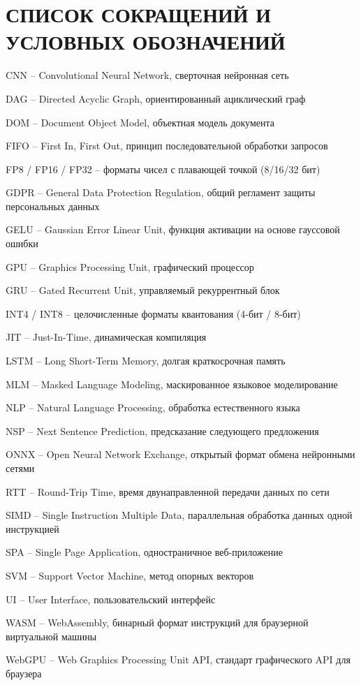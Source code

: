 \chapter*{СПИСОК СОКРАЩЕНИЙ И УСЛОВНЫХ ОБОЗНАЧЕНИЙ}

\noindent CNN – Convolutional Neural Network, сверточная нейронная сеть

\noindent DAG – Directed Acyclic Graph, ориентированный ациклический граф

\noindent DOM – Document Object Model, объектная модель документа

\noindent FIFO – First In, First Out, принцип последовательной обработки запросов

\noindent FP8 / FP16 / FP32 – форматы чисел с плавающей точкой (8/16/32 бит)

\noindent GDPR – General Data Protection Regulation, общий регламент защиты персональных данных

\noindent GELU – Gaussian Error Linear Unit, функция активации на основе гауссовой ошибки

\noindent GPU – Graphics Processing Unit, графический процессор

\noindent GRU – Gated Recurrent Unit, управляемый рекуррентный блок

\noindent INT4 / INT8 – целочисленные форматы квантования (4-бит / 8-бит)

\noindent JIT – Just-In-Time, динамическая компиляция

\noindent LSTM – Long Short-Term Memory, долгая краткосрочная память

\noindent MLM – Masked Language Modeling, маскированное языковое моделирование

\noindent NLP – Natural Language Processing, обработка естественного языка

\noindent NSP – Next Sentence Prediction, предсказание следующего предложения

\noindent ONNX – Open Neural Network Exchange, открытый формат обмена нейронными сетями

\noindent RTT – Round-Trip Time, время двунаправленной передачи данных по сети

\noindent SIMD – Single Instruction Multiple Data, параллельная обработка данных одной инструкцией

\noindent SPA – Single Page Application, одностраничное веб-приложение

\noindent SVM – Support Vector Machine, метод опорных векторов

\noindent UI – User Interface, пользовательский интерфейс

\noindent WASM – WebAssembly, бинарный формат инструкций для браузерной виртуальной машины

\noindent WebGPU – Web Graphics Processing Unit API, стандарт графического API для браузера